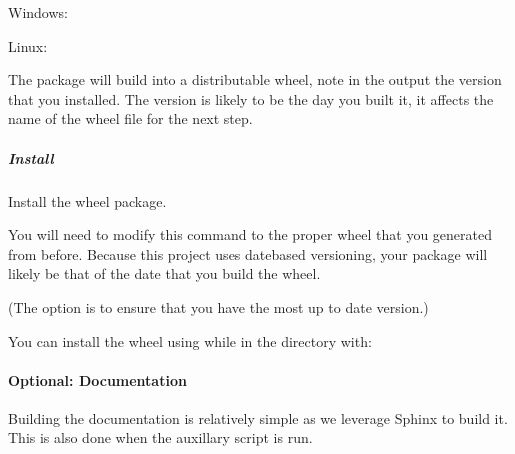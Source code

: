 \documentclass[letterpaper,11pt,english]{sphinxmanual}
\begin{document}
\sphinxAtStartPar
Windows: 

\sphinxAtStartPar
Linux: 

\sphinxAtStartPar
The package will build into a distributable wheel, note in the output the
version that you installed. The version is likely to be the day you built it,
it affects the name of the wheel file for the next step.


\subparagraph{Install}
\label{\detokenize{technical/installation/python:install}}
\sphinxAtStartPar
Install the wheel package.

\sphinxAtStartPar
You will need to modify this command to the proper wheel that you generated
from before. Because this project uses date\sphinxhyphen{}based versioning, your package
will likely be that of the date that you build the wheel.

\sphinxAtStartPar
(The  option is to ensure that you have the most up to date
version.)

\sphinxAtStartPar
You can install the wheel using while in the  directory
with:

\begin{sphinxVerbatim}[commandchars=\\\{\}]
   
\end{sphinxVerbatim}

\sphinxstepscope


\paragraph{Optional: Documentation}
\label{\detokenize{technical/installation/documentation:optional-documentation}}\label{\detokenize{technical/installation/documentation:technical-installation-documentation}}\label{\detokenize{technical/installation/documentation::doc}}
\sphinxAtStartPar
Building the documentation is relatively simple as we leverage Sphinx to
build it. This is also done when the  auxillary script is
run.
\end{document}
